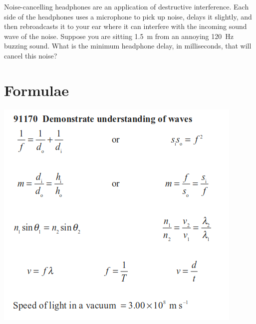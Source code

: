 \documentclass[a4paper]{exam}
\begin{document}
\begin{questions}
    \question Noise-cancelling headphones are an application of destructive interference. Each side of the headphones uses a microphone
              to pick up noise, delays it slightly, and then rebroadcasts it to your ear where it can interfere with the incoming sound
              wave of the noise. Suppose you are sitting \SI{1.5}{\metre} from an annoying \SI{120}{\hertz} buzzing sound. What is the
              minimum headphone delay, in milliseconds, that will cancel this noise?
  \end{questions}
  \clearpage
  \section*{Formulae}
  \includegraphics{waves}
\end{document}
